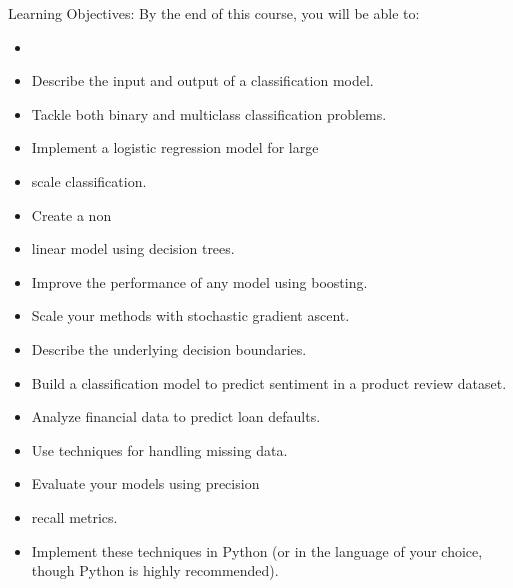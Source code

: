 Learning Objectives: By the end of this course, you will be able to:
\begin{itemize}
	\item \item Describe the input and output of a classification model.
	\item Tackle both binary and multiclass classification problems.
	\item Implement a logistic regression model for large\item scale classification.  
	\item Create a non\item linear model using decision trees.
	\item Improve the performance of any model using boosting.
	\item Scale your methods with stochastic gradient ascent.
	\item Describe the underlying decision boundaries.  
	\item Build a classification model to predict sentiment in a product review dataset.  
	\item Analyze financial data to predict loan defaults.
	\item Use techniques for handling missing data.
	\item Evaluate your models using precision\item recall metrics.
	\item Implement these techniques in Python (or in the language of your choice, though Python is highly recommended).
\end{itemize}
\newpage
